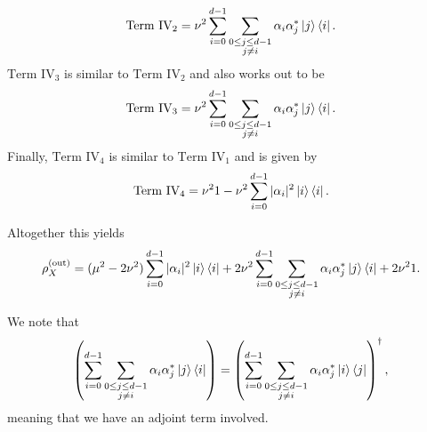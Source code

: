 \documentclass[reqno]{amsart}
\numberwithin{lemma}{section}
\numberwithin{proposition}{section}
\newcommand{\out}{\textnormal{out}}
\begin{document}
{\begin{remark}
\begin{equation*}
\text{Term IV}_{2} = \nu^{2} \sum_{i=0}^{d-1} \sum_{\substack{0 \leq j \leq d-1\\j \neq i}} \alpha_{i} \alpha_{j}^{*} \ket{j}\bra{i}.
\end{equation*}
$\text{Term IV}_{3}$ is similar to $\text{Term IV}_{2}$ and also works out to be
\begin{equation*}
\text{Term IV}_{3} = \nu^{2} \sum_{i=0}^{d-1} \sum_{\substack{0 \leq j \leq d-1\\j \neq i}} \alpha_{i} \alpha_{j}^{*} \ket{j}\bra{i}.
\end{equation*}
Finally, $\text{Term IV}_{4}$ is similar to $\text{Term IV}_{1}$ and is given by
\begin{equation*}
\text{Term IV}_{4} = \nu^{2} 1 - \nu^{2} \sum_{i=0}^{d-1} \vert \alpha_{i} \vert^{2} \ket{i}\bra{i}.
\end{equation*}

Altogether this yields
\begin{equation*}
\rho_{X}^{(\out)} = (\mu^{2} - 2\nu^{2}) \sum_{i=0}^{d-1} \vert \alpha_{i} \vert^{2} \ket{i} \bra{i} + 2 \nu^{2} \sum_{i=0}^{d-1} \sum_{\substack{0 \leq j \leq d-1\\ j \neq i}} \alpha_{i} \alpha_{j}^{*} \ket{j} \bra{i} + 2 \nu^{2} 1.
\end{equation*}



We note that
\begin{equation*}
\left ( \sum_{i=0}^{d-1} \sum_{\substack{0 \leq j \leq d-1\\ j \neq i}} \alpha_{i} \alpha_{j}^{*} \ket{j}\bra{i} \right ) = \left ( \sum_{i=0}^{d-1} \sum_{\substack{0 \leq j \leq d-1\\ j \neq i}} \alpha_{i} \alpha_{j}^{*} \ket{i}\bra{j} \right )^{\dagger}, 
\end{equation*}
meaning that we have an adjoint term involved.
\end{remark}

}
\end{document}
